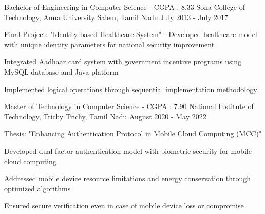 \documentclass[11pt, a4paper]{awesome-cv} %
\begin{document}
\makecvheader %

\begin{cventries}
\cventry
    {Bachelor of Engineering in Computer Science  -  CGPA : 8.33} %
    {Sona College of Technology, Anna University} %
    {Salem, Tamil Nadu} %
    {July 2013 - July 2017} %
    {
      \begin{cvitems}
        \item {Final Project: "Identity-based Healthcare System" - Developed healthcare model with unique identity parameters for national security improvement}
        \item {Integrated Aadhaar card system with government incentive programs using MySQL database and Java platform}
        \item {Implemented logical operations through sequential implementation methodology}
      \end{cvitems}
    }

    \cventry
    {Master of Technology in Computer Science  - CGPA : 7.90} %
    {National Institute of Technology, Trichy} %
    {Trichy, Tamil Nadu} %
    {August 2020 - May 2022} %
    {
      \begin{cvitems}
        \item {Thesis: "Enhancing Authentication Protocol in Mobile Cloud Computing (MCC)"}
        \item {Developed dual-factor authentication model with biometric security for mobile cloud computing}
        \item {Addressed mobile device resource limitations and energy conservation through optimized algorithms}
        \item {Ensured secure verification even in case of mobile device loss or compromise}
      \end{cvitems}
    }
\end{cventries}

\begin{cvskills}
\end{cvskills}
\end{document}
